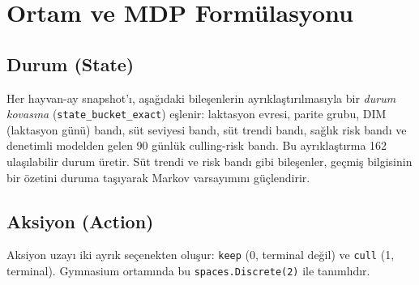 \documentclass[conference]{IEEEtran}
\begin{document}
\section{Ortam ve MDP Formülasyonu}
\subsection{Durum (State)}
Her hayvan-ay snapshot'ı, aşağıdaki bileşenlerin ayrıklaştırılmasıyla bir \emph{durum
kovasına} (\texttt{state\_bucket\_exact}) eşlenir:
laktasyon evresi, parite grubu, DIM (laktasyon günü) bandı, süt seviyesi bandı, süt
trendi bandı, sağlık risk bandı ve denetimli modelden gelen 90 günlük culling-risk bandı.
Bu ayrıklaştırma 162 ulaşılabilir durum üretir. Süt trendi ve risk bandı gibi bileşenler,
geçmiş bilgisinin bir özetini duruma taşıyarak Markov varsayımını güçlendirir.

\subsection{Aksiyon (Action)}
Aksiyon uzayı iki ayrık seçenekten oluşur: \texttt{keep} (0, terminal değil) ve
\texttt{cull} (1, terminal). Gymnasium ortamında bu
\texttt{spaces.Discrete(2)} ile tanımlıdır.
\end{document}
